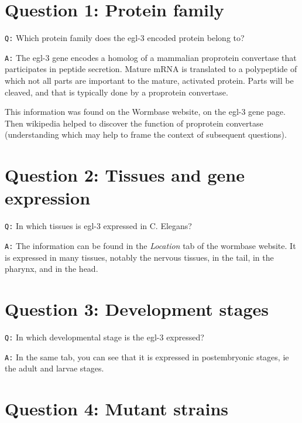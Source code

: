 \documentclass[11pt, a4paper,titlepage]{article}
\begin{document}

\setcounter{tocdepth}{3}

\tableofcontents
\newpage

\section*{Question 1: Protein family}

\texttt{Q:} Which protein family does the egl-3 encoded protein belong to?
\smallskip

\noindent\texttt{A:} The egl-3 gene encodes a homolog of a mammalian
proprotein convertase that participates in peptide secretion. Mature
mRNA is translated to a polypeptide of which not all parts are
important to the mature, activated protein. Parts will be cleaved, and
that is typically done by a proprotein convertase.

This information was found on the Wormbase website, on the egl-3 gene
page. Then wikipedia helped to discover the function of proprotein
convertase (understanding which may help to frame the context of
subsequent questions).

\section*{Question 2: Tissues and gene expression}

\texttt{Q:} In which tissues is egl-3 expressed in C. Elegans?
\smallskip

\noindent\texttt{A:} The information can be found in the
\emph{Location} tab of the wormbase website. It is expressed in many
tissues, notably the nervous tissues, in the tail, in the pharynx, and
in the head.

\section*{Question 3: Development stages}

\texttt{Q:} In which developmental stage is the egl-3 expressed?
\smallskip

\noindent\texttt{A:} In the same tab, you can see that it is expressed
in postembryonic stages, ie the adult and larvae stages.

\section*{Question 4: Mutant strains}
\end{document}
